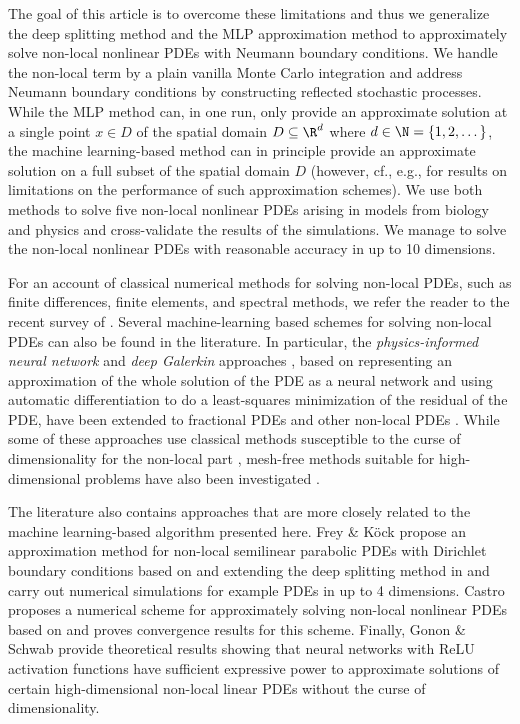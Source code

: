 The goal of this article is to overcome these limitations and thus we generalize the deep splitting method and the MLP approximation method to approximately solve non-local nonlinear PDEs with Neumann boundary conditions. We handle the non-local term by a plain vanilla Monte Carlo integration and address Neumann boundary conditions by constructing reflected stochastic processes. While the MLP method can, in one run, only provide an approximate solution at a single point $x \in D$ of the spatial domain $D\subseteq\R^d$ where $d\in\N=\{1,2,\dots\}$, the machine learning-based method can in principle provide an approximate solution on a full subset of the spatial domain $D$ (however, cf., e.g., \citep{heinrich1998monte,heinrich1999monte,grohs2021proof} for results on limitations on the performance of such approximation schemes).
%
We use both methods to solve five non-local nonlinear PDEs arising in models from biology and physics and cross-validate the results of the simulations.
%
We manage to solve the non-local nonlinear PDEs with reasonable accuracy in up to 10 dimensions.

For an account of classical numerical methods for solving non-local PDEs, such as finite differences, finite elements, and spectral methods, we refer the reader to the recent survey of \cite{delia2020numerical}. Several machine-learning based schemes for solving non-local PDEs can also be found in the literature. 
%
In particular, the \emph{physics-informed neural network} and \emph{deep Galerkin} approaches \citep{raissi2019physics,Sirignano2018dgm}, based on representing an approximation of the whole solution of the PDE as a neural network and using automatic differentiation to do a least-squares minimization of the residual of the PDE, have been extended to fractional PDEs and other non-local PDEs \citep{pang2019fpinns,lu2021deepxde,guo2022monte,alaradi2019extensions,yuan2022apinn}. While some of these approaches use classical methods susceptible to the curse of dimensionality for the non-local part \citep{pang2019fpinns,lu2021deepxde}, mesh-free methods suitable for high-dimensional problems have also been investigated \citep{guo2022monte,alaradi2019extensions,yuan2022apinn}. 

The literature also contains approaches that are more closely related to the machine learning-based algorithm presented here. Frey \& K\"ock \citep{frey2021deep,frey2022deep} propose an approximation method for non-local semilinear parabolic PDEs with Dirichlet boundary conditions based on and extending the deep splitting method in \citep{Beck2019} and carry out numerical simulations for example PDEs in up to 4 dimensions. Castro \citep{castro2021deep} proposes a numerical scheme for approximately solving non-local nonlinear PDEs based on \citep{hure2020deep} and proves convergence results for this scheme.
%
Finally, Gonon \& Schwab \citep{gonon2021deep} provide theoretical results showing that neural networks with ReLU activation functions have sufficient expressive power to approximate solutions of certain high-dimensional non-local linear PDEs without the curse of dimensionality.

